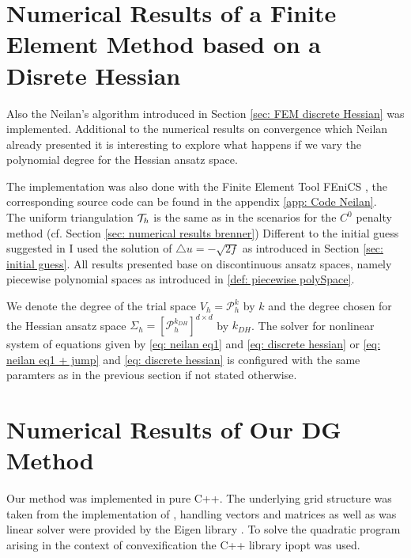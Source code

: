 \section{Numerical Results of a Finite Element Method based on a Disrete Hessian}

Also the Neilan's algorithm \cite{Neilan2014} introduced in Section \ref{sec: FEM discrete Hessian} was implemented.
Additional to the numerical results on convergence which Neilan already presented it is interesting to explore what happens if we vary the polynomial degree for the Hessian ansatz space. 

The implementation was also done with the Finite Element Tool FEniCS \cite{FEniCS}, the corresponding source code can be found in the appendix \ref{app: Code Neilan}. \\
The uniform triangulation $\mathcal{T}_h$ is the same as in the scenarios for the $C^0$ penalty method (cf. Section \ref{sec: numerical results brenner})
Different to the initial guess suggested in \cite{Neilan2014} I used the solution of $\triangle u = -\sqrt{2f}$ as introduced in Section \ref{sec: initial guess}. All results presented base on discontinuous ansatz spaces, namely piecewise polynomial spaces as introduced in \ref{def: piecewise polySpace}.

We denote the degree of the trial space $V_h=\mathcal P_h^k$ by $k$ and the degree chosen for the Hessian ansatz space $\Sigma_h = [\mathcal{P}_h^{k_{DH}}]^{d \times d}$ by $k_{DH}$. The solver for nonlinear system of equations given by \eqref{eq: neilan eq1} and \eqref{eq: discrete hessian} or \eqref{eq: neilan eq1 + jump} and \eqref{eq: discrete hessian} is configured with the same paramters as in the previous section if not stated otherwise. 










\newpage

\section{Numerical Results of Our DG Method}

Our method was implemented in pure C++. The underlying grid structure was taken from the implementation of \cite{BMV2009}, handling vectors and matrices as well as was linear solver were provided by the Eigen library \cite{eigenweb}. To solve the quadratic program arising in the context of convexification the C++ library ipopt \cite{ipopt} was used.

